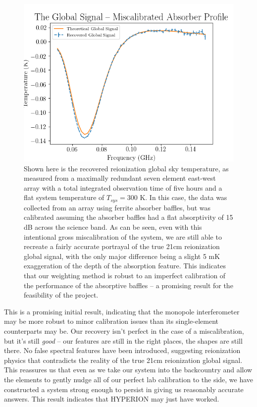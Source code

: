 \begin{figure}
    \begin{center}
    \includegraphics[width=\linewidth]{recovered_signal_diff_abs.png}
    \end{center}
    \caption{
        Shown here is the recovered reionization global sky temperature, as 
        measured from a maximally redundant seven element east-west array with 
        a total integrated observation time of five hours and a flat system 
        temperature of $T_{sys} = 300$ K. In this case, the data was collected 
        from an array using ferrite absorber baffles, but was calibrated 
        assuming the absorber baffles had a flat absorptivity of 15 dB across 
        the science band. As can be seen, even with this intentional gross 
        miscalibration of the system, we are still able to recreate a fairly 
        accurate portrayal of the true 21cm reionization global signal, with 
        the only major difference being a slight 5 mK exaggeration of the depth 
        of the absorption feature. This indicates that our weighting method is 
        robust to an imperfect calibration of the performance of the absorptive 
        baffles -- a promising result for the feasibility of the project.
    }
    \label{fig:recovered-mismatched}
\end{figure}

This is a promising initial result, indicating that the monopole interferometer 
may be more robust to minor calibration issues than its single-element 
counterparts may be. Our recovery isn't perfect in the case of a 
miscalibration, but it's still \emph{good} -- our features are still in the 
right places, the shapes are still there. No false spectral features have been 
introduced, suggesting reionization physics that contradicts the reality of the 
true 21cm reionization global signal.  This reassures us that even as we take 
our system into the backcountry and allow the elements to gently nudge all of 
our perfect lab calibration to the side, we have constructed a system strong 
enough to persist in giving us reasonably accurate answers. This result 
indicates that HYPERION may just have worked.
